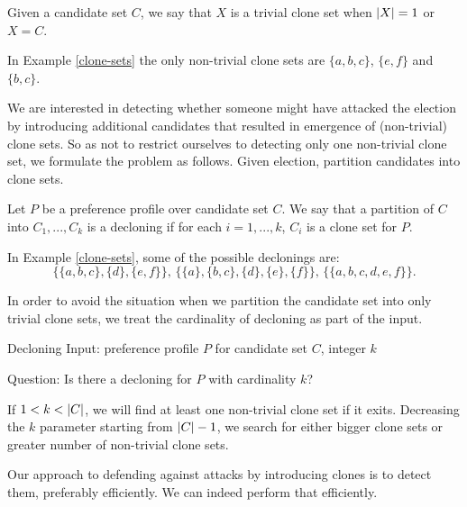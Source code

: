 \begin{defn}
Given a candidate set $C$, we say that $X$ is a trivial clone set
when $\left\vert X \right\vert = 1$ or $X = C$.
\end{defn}

\begin{exmp}
In Example \ref{clone-sets} the only non-trivial clone sets are
$\{a,b,c\}$, $\{e,f\}$ and $\{b,c\}$.
\end{exmp}

We are interested in detecting whether someone might have attacked the election by introducing
additional candidates that resulted in emergence of (non-trivial) clone sets.
So as not to restrict ourselves to detecting only one non-trivial clone set, we formulate the problem as follows.
Given election, partition candidates into clone sets.

\begin{defn}[decloning]
Let $P$ be a preference profile over candidate set $C$.
We say that a partition of $C$ into $C_1, ..., C_k$ is a decloning
if for each $i=1,...,k$, $C_i$ is a clone set for $P$.
\end{defn}

\begin{exmp}
In Example \ref{clone-sets}, some of the possible declonings are:
$$
\big\{ \{a,b,c\}, \{d\}, \{e,f\} \big\} \text{, }
\big\{ \{a\}, \{b,c\}, \{d\}, \{e\}, \{f\} \big\} \text{, }
\big\{ \{a,b,c,d,e,f\} \big\} \text{.}
$$
\end{exmp}

In order to avoid the situation when we partition the candidate set into only trivial clone sets,
we treat the cardinality of decloning as part of the input.


\begin{problem}{Decloning}
    Input: preference profile $P$ for candidate set $C$, integer $k$

    Question: Is there a decloning for $P$ with cardinality $k$?
\end{problem}

\begin{rmrk}
If $1 < k < \left\vert C \right\vert$, we will find at least one non-trivial clone set if it exits.
Decreasing the $k$ parameter starting from $\left\vert C \right\vert - 1$, we search for either
bigger clone sets or greater number of non-trivial clone sets.
\end{rmrk}

Our approach to defending against attacks by introducing clones
is to detect them, preferably efficiently.
We can indeed perform that efficiently.

